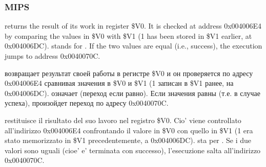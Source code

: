 \subsubsection{MIPS}



\ifdefined\ENGLISH
\scanf returns the result of its work in register \$V0. It is checked at address 0x004006E4
by comparing the values in \$V0 with \$V1 (1 has been stored in \$V1 earlier, at 0x004006DC).
 stands for .
If the two values are equal (i.e., success), the execution jumps to address 0x0040070C.
\fi

\ifdefined\RUSSIAN
\scanf возвращает результат своей работы в регистре \$V0 и он проверяется по адресу 0x004006E4
сравнивая значения в \$V0 и \$V1 (1 записан в \$V1 ранее, на 0x004006DC).
 означает  (переход если равно).
Если значения равны (т.е. в случае успеха), произойдет переход по адресу 0x0040070C.
\fi

\ifdefined\ITALIAN
\scanf restituisce il risultato del suo lavoro nel registro \$V0. Cio' viene controllato all'indirizzo 0x004006E4
confrontando il valore in \$V0 con quello in \$V1 (1 era stato memorizzato in \$V1 precedentemente, a 0x004006DC).
 sta per .
Se i due valori sono uguali (cioe' \scanf e' terminata con successo), l'esecuzione salta all'indirizzo 0x0040070C.
\fi
